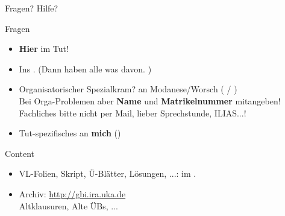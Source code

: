 \begin{frame}{Fragen? Hilfe?}	
	\begin{block}{Fragen}
		\begin{itemize}
			\item \textbf{Hier} im Tut!
			\item Ins \ILIAS. (Dann haben alle was davon. \smiley) \\
			\pause
			\item Organisatorischer Spezialkram? \impl an Modanese/Worsch ( / ) \\
			Bei Orga-Problemen aber \textbf{Name} und \textbf{Matrikelnummer}  mitangeben! \\
			Fachliches bitte nicht per Mail, lieber \impl Sprechstunde, ILIAS...!
			\item Tut-spezifisches an \textbf{mich} (\mailto{\mymail})
		\end{itemize}
	\end{block}
	\pause
	\begin{block}{Content}
		\begin{itemize}
			\item VL-Folien, Skript, Ü-Blätter, Lösungen, ...: im \ILIAS.
			\item Archiv: \url{http://gbi.ira.uka.de} \\
			Altklausuren, Alte ÜBs, ...
		\end{itemize}
	\end{block}
\end{frame}



